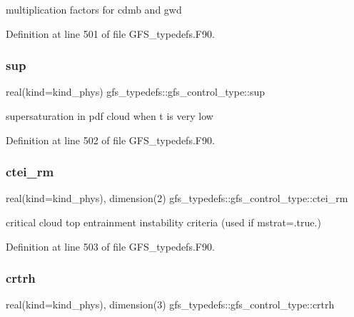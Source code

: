 multiplication factors for cdmb and gwd 



Definition at line 501 of file G\+F\+S\+\_\+typedefs.\+F90.

\mbox{\label{structgfs__typedefs_1_1gfs__control__type_a752993c00ad7706a9ba76ce5183fa76d}} 
\subsubsection{sup}
{\footnotesize\ttfamily real(kind=kind\+\_\+phys) gfs\+\_\+typedefs\+::gfs\+\_\+control\+\_\+type\+::sup}



supersaturation in pdf cloud when t is very low 



Definition at line 502 of file G\+F\+S\+\_\+typedefs.\+F90.

\mbox{\label{structgfs__typedefs_1_1gfs__control__type_a4f84060c52f0fe0cc1a8793a42bd2519}} 
\subsubsection{ctei\+\_\+rm}
{\footnotesize\ttfamily real(kind=kind\+\_\+phys), dimension(2) gfs\+\_\+typedefs\+::gfs\+\_\+control\+\_\+type\+::ctei\+\_\+rm}



critical cloud top entrainment instability criteria (used if mstrat=.true.) 



Definition at line 503 of file G\+F\+S\+\_\+typedefs.\+F90.

\mbox{\label{structgfs__typedefs_1_1gfs__control__type_a6a3e396b8dfaa5606daab8243b01b983}} 
\subsubsection{crtrh}
{\footnotesize\ttfamily real(kind=kind\+\_\+phys), dimension(3) gfs\+\_\+typedefs\+::gfs\+\_\+control\+\_\+type\+::crtrh}



